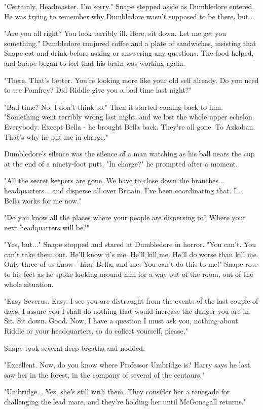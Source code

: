 \documentclass[a4paper,11pt]{article}
\begin{document}
"Certainly, Headmaster. I'm sorry." Snape stepped aside as Dumbledore entered. He was trying to remember why Dumbledore wasn't supposed to be there, but...

"Are you all right? You look terribly ill. Here, sit down. Let me get you something." Dumbledore conjured coffee and a plate of sandwiches, insisting that Snape eat and drink before asking or answering any questions. The food helped, and Snape began to feel that his brain was working again.

"There. That's better. You're looking more like your old self already. Do you need to see Pomfrey? Did Riddle give you a bad time last night?"

"Bad time? No, I don't think so." Then it started coming back to him. "Something went terribly wrong last night, and we lost the whole upper echelon. Everybody. Except Bella - he brought Bella back. They're all gone. To Azkaban. That's why he put me in charge."

Dumbledore's silence was the silence of a man watching as his ball nears the cup at the end of a ninety-foot putt. "In charge?" he prompted after a moment.

"All the secret keepers are gone. We have to close down the branches... headquarters... and disperse all over Britain. I've been coordinating that. I... Bella works for me now."

"Do you know all the places where your people are dispersing to? Where your next headquarters will be?"

"Yes, but..." Snape stopped and stared at Dumbledore in horror. "You can't. You can't take them out. He'll know it's me. He'll kill me. He'll do worse than kill me. Only three of us know - him, Bella, and me. You can't do this to me!" Snape rose to his feet as he spoke looking around him for a way out of the room, out of the whole situation.

"Easy Severus. Easy. I see you are distraught from the events of the last couple of days. I assure you I shall do nothing that would increase the danger you are in. Sit. Sit down. Good. Now, I have a question I must ask you, nothing about Riddle or your headquarters, so do collect yourself, please."

Snape took several deep breaths and nodded.

"Excellent. Now, do you know where Professor Umbridge is? Harry says he last saw her in the forest, in the company of several of the centaurs."

"Umbridge... Yes, she's still with them. They consider her a renegade for challenging the lead mare, and they're holding her until McGonagall returns."
\end{document}
